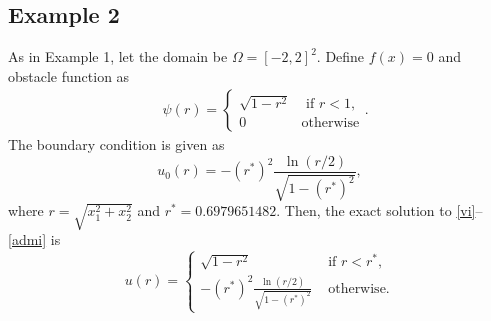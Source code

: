 \documentclass[12pt]{article}
\begin{document}
\subsection{Example 2}
As in Example 1, let the domain be $\Omega=[-2,2]^2$. Define $f(x)=0$ and obstacle function as
\begin{align*}
  &\psi(r)=\begin{cases}\sqrt{1-r^2}&\text{ if } r<1, \\
                                  0&\text{otherwise}\end{cases}.\label{ex2-f}
\end{align*}
The boundary condition is given as 
\[ u_0(r)=-\left(r^*\right)^2\frac{\ln(r/2)}{\sqrt{1-\left(r^*\right)^2}} \label{ex2-u0}, \]
where $r=\sqrt{x_1^2+x_2^2}$ and $r^*=0.6979651482$.
Then, the exact solution to \eqref{vi}--\eqref{admi} is
\begin{equation*}
u(r)=  \begin{cases}
  \sqrt{1-r^2} &\text{ if } r<r^*,\\
  -\left(r^*\right)^2\frac{\ln(r/2)}{\sqrt{1-\left(r^*\right)^2}} & \text{ otherwise} .
\end{cases}
\end{equation*}





\end{document}
